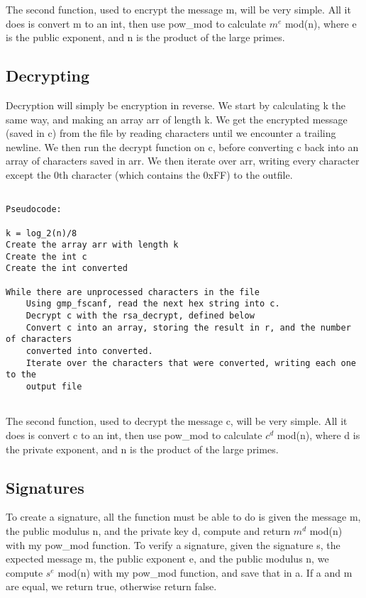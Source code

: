 \documentclass[11pt]{article}
\begin{document}
The second function, used to encrypt the message m, will be very simple. All it does is convert m to an int, then use pow\_mod to calculate $m^e$ mod(n), where e is the public exponent, and n is the product of the large primes.

\subsection{Decrypting}

Decryption will simply be encryption in reverse. We start by calculating k the same way, and making an array arr of length k. We get the encrypted message (saved in c) from the file by reading characters until we encounter a trailing newline. We then run the decrypt function on c, before converting c back into an array of characters saved in arr. We then iterate over arr, writing every character except the 0th character (which contains the 0xFF) to the outfile.

\begin{verbatim}

Pseudocode:

k = log_2(n)/8
Create the array arr with length k
Create the int c
Create the int converted

While there are unprocessed characters in the file
    Using gmp_fscanf, read the next hex string into c.
    Decrypt c with the rsa_decrypt, defined below
    Convert c into an array, storing the result in r, and the number of characters
    converted into converted.
    Iterate over the characters that were converted, writing each one to the
    output file


\end{verbatim}

The second function, used to decrypt the message c, will be very simple. All it does is convert c to an int, then use pow\_mod to calculate $c^d$ mod(n), where d is the private exponent, and n is the product of the large primes.

\subsection{Signatures}

To create a signature, all the function must be able to do is given the message m, the public modulus n, and the private key d, compute and return $m^d$ mod(n) with my pow\_mod function.
To verify a signature, given the signature s, the expected message m, the public exponent e, and the public modulus n, we compute $s^e$ mod(n) with my pow\_mod function, and save that in a. If a and m are equal, we return true, otherwise return false.
\end{document}
